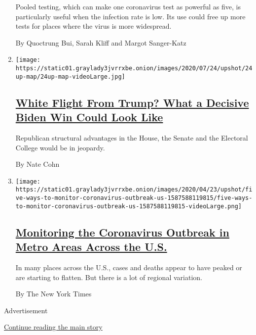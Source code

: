 \begin{enumerate}
  Pooled testing, which can make one coronavirus test as powerful as
  five, is particularly useful when the infection rate is low. Its use
  could free up more tests for places where the virus is more
  widespread.

  By Quoctrung Bui, Sarah Kliff and Margot Sanger-Katz
\item
  \texttt{[image: https://static01.graylady3jvrrxbe.onion/images/2020/07/24/upshot/24up-map/24up-map-videoLarge.jpg]}

  \hypertarget{white-flight-from-trump-what-a-decisive-biden-win-could-look-like}{%
  \subsection{\texorpdfstring{\href{/2020/07/24/upshot/biden-polls-demographics.html}{White
  Flight From Trump? What a Decisive Biden Win Could Look
  Like}}{White Flight From Trump? What a Decisive Biden Win Could Look Like}}\label{white-flight-from-trump-what-a-decisive-biden-win-could-look-like}}

  Republican structural advantages in the House, the Senate and the
  Electoral College would be in jeopardy.

  By Nate Cohn
\item
  \texttt{[image: https://static01.graylady3jvrrxbe.onion/images/2020/04/23/upshot/five-ways-to-monitor-coronavirus-outbreak-us-1587588119815/five-ways-to-monitor-coronavirus-outbreak-us-1587588119815-videoLarge.png]}

  \hypertarget{monitoring-the-coronavirus-outbreak-in-metro-areas-across-the-us}{%
  \subsection{\texorpdfstring{\href{/interactive/2020/04/23/upshot/five-ways-to-monitor-coronavirus-outbreak-us.html}{Monitoring
  the Coronavirus Outbreak in Metro Areas Across the
  U.S.}}{Monitoring the Coronavirus Outbreak in Metro Areas Across the U.S.}}\label{monitoring-the-coronavirus-outbreak-in-metro-areas-across-the-us}}

  In many places across the U.S., cases and deaths appear to have peaked
  or are starting to flatten. But there is a lot of regional variation.

  By The New York Times
\end{enumerate}

Advertisement

\protect\hyperlink{after-mid1}{Continue reading the main story}

